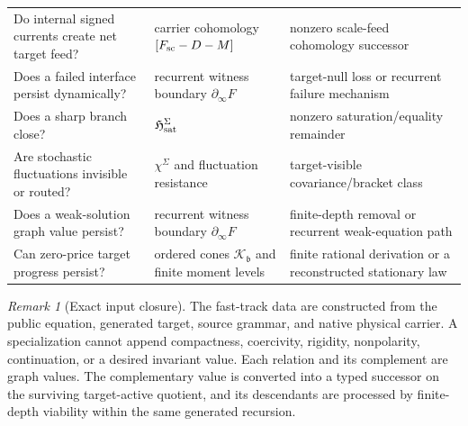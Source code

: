 \documentclass[11pt]{article}
\numberwithin{section}{part}
\theoremstyle{plain}
\theoremstyle{definition}
\theoremstyle{remark}
\newtheorem{remark}[remark]{Remark}
\begin{document}
\begin{center}
\begin{tabular}{p{.25\linewidth}p{.33\linewidth}p{.32\linewidth}}
Do internal signed currents create net target feed? & carrier cohomology
\([F_{\rm sc}-D-M]\) & nonzero scale-feed cohomology successor\\
Does a failed interface persist dynamically? & recurrent witness boundary
\(\partial_\infty F\) & target-null loss or recurrent failure mechanism\\
Does a sharp branch close? & \(\mathfrak H_{\rm sat}^{\Sigma}\) & nonzero
saturation/equality remainder\\
Are stochastic fluctuations invisible or routed? & \(\chi^\Sigma\) and
fluctuation resistance & target-visible covariance/bracket class\\
Does a weak-solution graph value persist? & recurrent witness boundary
\(\partial_\infty F\) & finite-depth removal or recurrent weak-equation path\\
Can zero-price target progress persist? &
ordered cones \(\mathcal K_{\mathfrak b}\) and finite moment levels &
finite rational derivation or a reconstructed stationary law\\
\bottomrule
\end{tabular}
\end{center}

\begin{remark}[Exact input closure]
\label{rem:invariant-evaluation}
The fast-track data are constructed from the public equation, generated target,
source grammar, and native physical carrier.  A specialization cannot append
compactness, coercivity, rigidity, nonpolarity, continuation, or a desired
invariant value.  Each relation and its complement are graph values.  The
complementary value is converted into a typed successor on the surviving
target-active quotient, and its descendants are processed by finite-depth
viability within the same generated recursion.
\end{remark}
\end{document}
